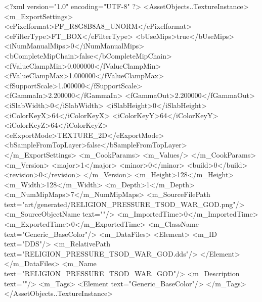<?xml version="1.0" encoding="UTF-8" ?>
<AssetObjects..TextureInstance>
	<m_ExportSettings>
		<ePixelformat>PF_R8G8B8A8_UNORM</ePixelformat>
		<eFilterType>FT_BOX</eFilterType>
		<bUseMips>true</bUseMips>
		<iNumManualMips>0</iNumManualMips>
		<bCompleteMipChain>false</bCompleteMipChain>
		<fValueClampMin>0.000000</fValueClampMin>
		<fValueClampMax>1.000000</fValueClampMax>
		<fSupportScale>1.000000</fSupportScale>
		<fGammaIn>2.200000</fGammaIn>
		<fGammaOut>2.200000</fGammaOut>
		<iSlabWidth>0</iSlabWidth>
		<iSlabHeight>0</iSlabHeight>
		<iColorKeyX>64</iColorKeyX>
		<iColorKeyY>64</iColorKeyY>
		<iColorKeyZ>64</iColorKeyZ>
		<eExportMode>TEXTURE_2D</eExportMode>
		<bSampleFromTopLayer>false</bSampleFromTopLayer>
	</m_ExportSettings>
	<m_CookParams>
		<m_Values/>
	</m_CookParams>
	<m_Version>
		<major>1</major>
		<minor>0</minor>
		<build>0</build>
		<revision>0</revision>
	</m_Version>
	<m_Height>128</m_Height>
	<m_Width>128</m_Width>
	<m_Depth>1</m_Depth>
	<m_NumMipMaps>7</m_NumMipMaps>
	<m_SourceFilePath text="art/generated/RELIGION_PRESSURE_TSOD_WAR_GOD.png"/>
	<m_SourceObjectName text=""/>
	<m_ImportedTime>0</m_ImportedTime>
	<m_ExportedTime>0</m_ExportedTime>
	<m_ClassName text="Generic_BaseColor"/>
	<m_DataFiles>
		<Element>
			<m_ID text="DDS"/>
			<m_RelativePath text="RELIGION_PRESSURE_TSOD_WAR_GOD.dds"/>
		</Element>
	</m_DataFiles>
	<m_Name text="RELIGION_PRESSURE_TSOD_WAR_GOD"/>
	<m_Description text=""/>
	<m_Tags>
		<Element text="Generic_BaseColor"/>
	</m_Tags>
</AssetObjects..TextureInstance>

